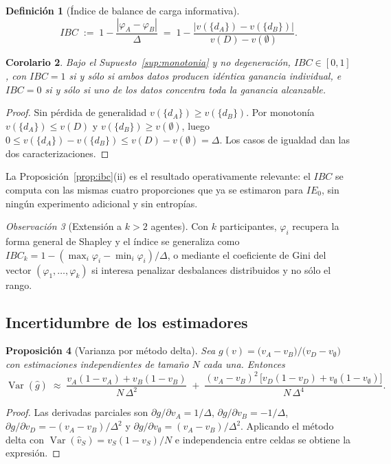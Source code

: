 \documentclass[11pt,a4paper]{article}
\theoremstyle{definition}
\newtheorem{definicion}{Definición}[section]
\theoremstyle{plain}
\newtheorem{proposicion}[definicion]{Proposición}
\newtheorem{corolario}[definicion]{Corolario}
\theoremstyle{remark}
\newtheorem{observacion}[definicion]{Observación}
\DeclareMathOperator{\Var}{Var}
\begin{document}
\begin{definicion}[Índice de balance de carga informativa]
\[
  IBC \;:=\; 1-\frac{|\varphi_A-\varphi_B|}{\Delta}
        \;=\; 1-\frac{\big|v(\{d_A\})-v(\{d_B\})\big|}{v(D)-v(\emptyset)}.
\]
\end{definicion}

\begin{corolario}
Bajo el Supuesto~\ref{sup:monotonia} y no degeneración, $IBC\in[0,1]$, con
$IBC=1$ si y sólo si ambos datos producen idéntica ganancia individual, e
$IBC=0$ si y sólo si uno de los datos concentra toda la ganancia alcanzable.
\end{corolario}

\begin{proof}
Sin pérdida de generalidad $v(\{d_A\})\ge v(\{d_B\})$. Por monotonía
$v(\{d_A\})\le v(D)$ y $v(\{d_B\})\ge v(\emptyset)$, luego
$0\le v(\{d_A\})-v(\{d_B\})\le v(D)-v(\emptyset)=\Delta$. Los casos de igualdad
dan las dos caracterizaciones.
\end{proof}

La Proposición~\ref{prop:ibc}(ii) es el resultado operativamente relevante: el
$IBC$ se computa con las mismas cuatro proporciones que ya se estimaron para
$IE_0$, sin ningún experimento adicional y sin entropías.

\begin{observacion}[Extensión a $k>2$ agentes]
Con $k$ participantes, $\varphi_i$ recupera la forma general de Shapley y el
índice se generaliza como $IBC_k = 1-(\max_i\varphi_i-\min_i\varphi_i)/\Delta$,
o mediante el coeficiente de Gini del vector $(\varphi_1,\dots,\varphi_k)$
si interesa penalizar desbalances distribuidos y no sólo el rango.
\end{observacion}

\subsection{Incertidumbre de los estimadores}

\begin{proposicion}[Varianza por método delta]\label{prop:delta}
Sea $g(v)=\big(v_A-v_B\big)/\big(v_D-v_\emptyset\big)$ con estimaciones
independientes de tamaño $N$ cada una. Entonces
\[
  \Var(\hat g)\;\approx\;
  \frac{v_A(1-v_A)+v_B(1-v_B)}{N\,\Delta^{2}}
  \;+\;
  \frac{(v_A-v_B)^{2}\,\big[v_D(1-v_D)+v_\emptyset(1-v_\emptyset)\big]}{N\,\Delta^{4}}.
\]
\end{proposicion}

\begin{proof}
Las derivadas parciales son $\partial g/\partial v_A = 1/\Delta$,
$\partial g/\partial v_B = -1/\Delta$,
$\partial g/\partial v_D = -(v_A-v_B)/\Delta^{2}$ y
$\partial g/\partial v_\emptyset = (v_A-v_B)/\Delta^{2}$. Aplicando el método
delta con $\Var(\hat v_S)=v_S(1-v_S)/N$ e independencia entre celdas se obtiene la
expresión.
\end{proof}
\end{document}
